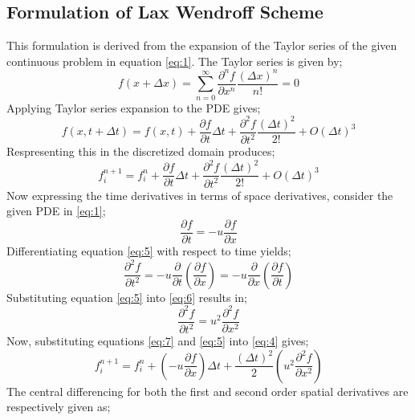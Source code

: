 \subsection{Formulation of Lax Wendroff Scheme}
This formulation is derived from the expansion of the Taylor series of the given continuous problem in equation \eqref{eq:1}. The Taylor series is given by;
\begin{equation*}
f(x + \Delta x) = \sum^{\infty}_{n=0}\frac{\partial^n f}{\partial x^n}\frac{(\Delta x)^n}{n!} = 0
\end{equation*}
Applying Taylor series expansion to the PDE gives;
\begin{equation*}
f(x,t + \Delta t) = f(x,t) + \frac{\partial f}{\partial t}\Delta t + \frac{\partial^2 f}{\partial t^2}\frac{(\Delta t)^2}{2!} + O(\Delta t)^3
\end{equation*}
Respresenting this in the discretized domain produces;
\begin{equation}
f^{n+1}_{i} = f^{n}_{i} + \frac{\partial f}{\partial t}\Delta t + \frac{\partial^2 f}{\partial t^2}\frac{(\Delta t)^2}{2!} + O(\Delta t)^3 \label{eq:4}
\end{equation}
Now expressing the time derivatives in terms of space derivatives, consider the given PDE in \eqref{eq:1};
\begin{equation}
\frac{\partial f}{\partial t} = - u \frac{\partial f}{\partial x} \label{eq:5}
\end{equation}
Differentiating equation \eqref{eq:5} with respect to time yields;
\begin{equation}
\frac{\partial^2 f}{\partial t^2} = -u\frac{\partial}{\partial t}\left(\frac{\partial f}{\partial x}\right) = -u\frac{\partial}{\partial x}\left(\frac{\partial f}{\partial t}\right) \label{eq:6}
\end{equation}
Substituting equation \eqref{eq:5} into \eqref{eq:6} results in;
\begin{equation}
\frac{\partial^2 f}{\partial t^2} = u^2\frac{\partial^2 f}{\partial x^2} \label{eq:7}
\end{equation}
Now, substituting equations \eqref{eq:7} and \eqref{eq:5} into \eqref{eq:4} gives;
\begin{equation}
f^{n+1}_{i} = f^{n}_{i} + \left(- u \frac{\partial f}{\partial x}\right) \Delta t + \frac{(\Delta t)^2}{2}\left(u^2\frac{\partial^2 f}{\partial x^2}\right) \label{eq:8}
\end{equation}
The central differencing for both the first and second order spatial derivatives are respectively given as;
